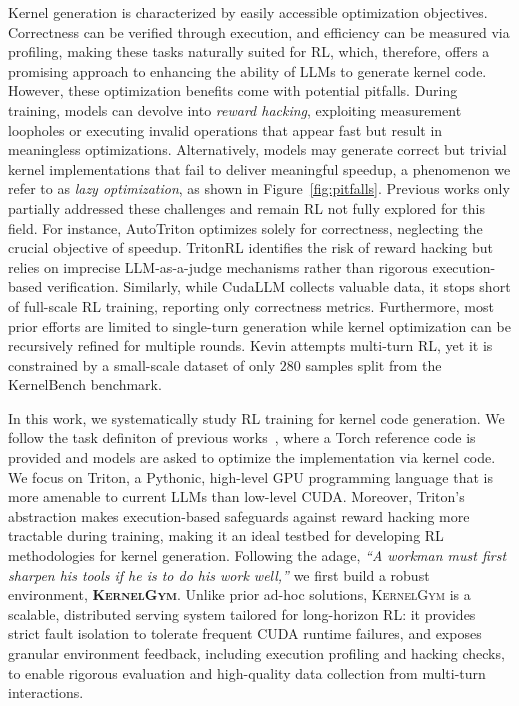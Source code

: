  Kernel generation is characterized by easily accessible optimization objectives. Correctness can be verified through execution, and efficiency can be measured via profiling, making these tasks naturally suited for RL, which, therefore, offers a promising approach to enhancing the ability of LLMs to generate kernel code. However, these optimization benefits come with potential pitfalls. During training, models can devolve into \emph{reward hacking}, exploiting measurement loopholes or executing invalid operations that appear fast but result in meaningless optimizations. Alternatively, models may generate correct but trivial kernel implementations that fail to deliver meaningful speedup, a phenomenon we refer to as \emph{lazy optimization}, as shown in Figure~\ref{fig:pitfalls}. Previous works only partially addressed these challenges and remain RL not fully explored for this field. For instance, AutoTriton \citep{li2025autotriton} optimizes solely for correctness, neglecting the crucial objective of speedup. TritonRL \citep{woo2025tritonrltrainingllmsthink} identifies the risk of reward hacking but relies on imprecise LLM-as-a-judge mechanisms rather than rigorous execution-based verification. Similarly, while CudaLLM \citep{cudallm2025} collects valuable data, it stops short of full-scale RL training, reporting only correctness metrics. Furthermore, most prior efforts are limited to single-turn generation while kernel optimization can be recursively refined for multiple rounds. Kevin \citep{baronio2025kevinmultiturnrlgenerating} attempts multi-turn RL, yet it is constrained by a small-scale dataset of only $280$ samples split from the KernelBench benchmark.

In this work, we systematically study RL training for kernel code generation. We follow the task definiton of previous works~\citep{ouyang2025kernelbench,li2025autotriton,baronio2025kevinmultiturnrlgenerating}, where a Torch reference code is provided and models are asked to optimize the implementation via kernel code. We focus on Triton, a Pythonic, high-level GPU programming language that is more amenable to current LLMs than low-level CUDA. Moreover, Triton's abstraction makes execution-based safeguards against reward hacking more tractable during training, making it an ideal testbed for developing RL methodologies for kernel generation. Following the adage, \emph{``A workman must first sharpen his tools if he is to do his work well,''} we first build a robust environment, \textbf{\textsc{KernelGym}}. Unlike prior ad-hoc solutions, \textsc{KernelGym} is a scalable, distributed serving system tailored for long-horizon RL: it provides strict fault isolation to tolerate frequent CUDA runtime failures, and exposes granular environment feedback, including execution profiling and hacking checks, to enable rigorous evaluation and high-quality data collection from multi-turn interactions.

